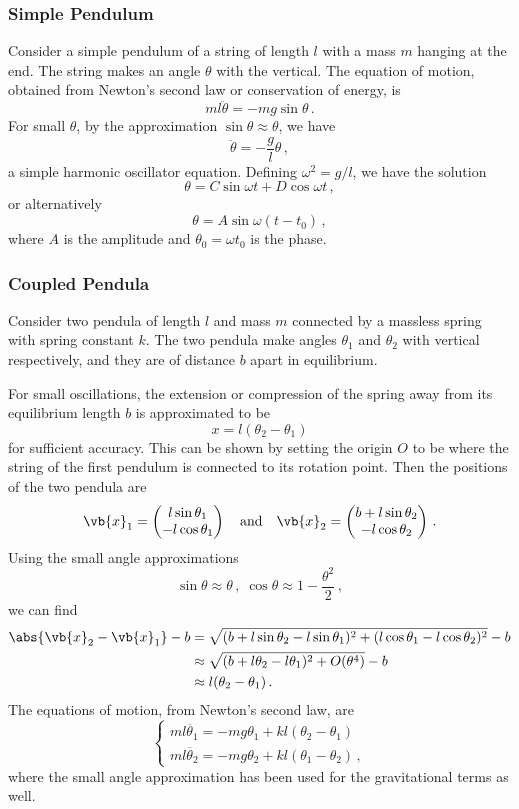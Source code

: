 \documentclass{article}
\theoremstyle{plain}\theoremheaderfont{\normalfont\itshape}\theorembodyfont{\rmfamily}\theoremseparator{.}\newtheorem*{rem}{Remark}\newtheorem*{ex}{Example}\newtheorem*{proof}{Proof}\newtheorem*{altp}{Alternative proof}
\theoremstyle{plain}\theoremheaderfont{\normalfont\bfseries}\theorembodyfont{\rmfamily}\theoremseparator{.}\newtheorem{thm}{Theorem}[section]\newtheorem{lem}[thm]{Lemma}\newtheorem{prop}[thm]{Proposition}\newtheorem*{cor}{Corollary}\newtheorem{defn}[thm]{Definition}\newtheorem{clm}[thm]{Claim}\newtheorem{clminproof}{Claim}
\theoremstyle{break}\theoremheaderfont{\normalfont\itshape}\theorembodyfont{\rmfamily}\theoremseparator{.\medskip}\newtheorem*{proofskip}{Proof}\newtheorem*{exs}{Examples}\newtheorem*{rems}{Remarks}
\theoremstyle{break}\theoremheaderfont{\normalfont\bfseries}\theorembodyfont{\rmfamily}\theoremseparator{.\medskip}\newtheorem{lemskip}[thm]{Lemma}\newtheorem{defnskip}[thm]{Definition}\newtheorem{propskip}[thm]{Proposition}\newtheorem{thmskip}[thm]{Theorem}
\numberwithin{equation}{section}
\begin{document}
	\subsubsection{Simple Pendulum}
	Consider a simple pendulum of a string of length \(l\) with a mass \(m\) hanging at the end. The string makes an angle \(\theta\) with the vertical. The equation of motion, obtained from Newton's second law or conservation of energy, is
	\[ml\ddot{\theta}=-mg\sin\theta\,.\]
	For small \(\theta\), by the approximation \(\sin\theta\approx\theta\), we have
	\[\ddot{\theta}=-\frac{g}{l}\theta\,,\]
	a simple harmonic oscillator equation. Defining \(\omega^2=g/l\), we have the solution
	\[\theta=C\sin\omega t+D\cos\omega t\,,\]
	or alternatively
	\[\theta=A\sin\omega(t-t_0)\,,\]
	where \(A\) is the amplitude and \(\theta_0=\omega t_0\) is the phase.
	\subsubsection{Coupled Pendula}
	Consider two pendula of length \(l\) and mass \(m\) connected by a massless spring with spring constant \(k\). The two pendula make angles \(\theta_1\) and \(\theta_2\) with vertical respectively, and they are of distance \(b\) apart in equilibrium.

	For small oscillations, the extension or compression of the spring away from its equilibrium length \(b\) is approximated to be
	\[x=l(\theta_2-\theta_1)\]
	for sufficient accuracy. This can be shown by setting the origin \(O\) to be where the string of the first pendulum is connected to its rotation point. Then the positions of the two pendula are
	\[\vb{x}_1=\begin{pmatrix}
		l\sin\theta_1\\
		-l\cos\theta_1
	\end{pmatrix}\quad\text{and}\quad\vb{x}_2=\begin{pmatrix}
		b+l\sin\theta_2\\
		-l\cos\theta_2
	\end{pmatrix}\,.\]
	Using the small angle approximations
	\[\sin\theta\approx\theta\,,\;\cos\theta\approx 1-\frac{\theta^2}{2}\,,\]
	we can find
	\begin{align*}
		\abs{\vb{x}_2-\vb{x}_1}-b&=\sqrt{(b+l\sin\theta_2-l\sin\theta_1)^2+(l\cos\theta_1-l\cos\theta_2)^2}-b\\
		&\approx\sqrt{(b+l\theta_2-l\theta_1)^2+O(\theta^4)}-b\\
		&\approx l(\theta_2-\theta_1)\,.
	\end{align*}
	The equations of motion, from Newton's second law, are
	\[\begin{cases}
		ml\ddot{\theta_1}=-mg\theta_1+kl(\theta_2-\theta_1)\\
		ml\ddot{\theta_2}=-mg\theta_2+kl(\theta_1-\theta_2)\,,
	\end{cases}\]
	where the small angle approximation has been used for the gravitational terms as well.
\end{document}
